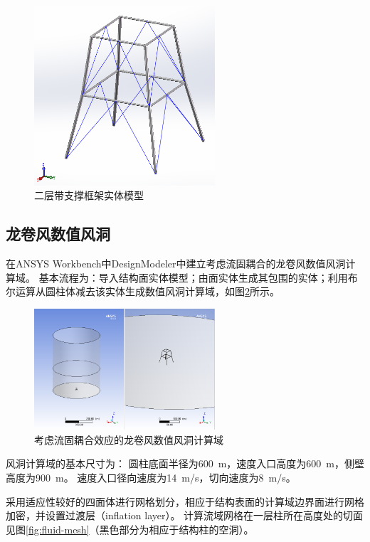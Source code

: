\documentclass{ctexart}
\begin{document}
\begin{figure}[!htpb]
  \centering
  \includegraphics[width=0.6\textwidth]{tower.png}
  \caption{二层带支撑框架实体模型}
  \label{fig:tower}
\end{figure}


\subsection{龙卷风数值风洞}
在ANSYS Workbench中DesignModeler中建立考虑流固耦合的龙卷风数值风洞计算域。
基本流程为：导入结构面实体模型；由面实体生成其包围的实体；利用布尔运算从圆柱体减去该实体生成数值风洞计算域，如图\ref{fig:domain}所示。

\begin{figure}[!htpb]
  \centering
  \includegraphics[width=0.6\textwidth]{domain.png}
  \caption{考虑流固耦合效应的龙卷风数值风洞计算域}
  \label{fig:domain}
\end{figure}

风洞计算域的基本尺寸为：
圆柱底面半径为\SI{600}{m}，速度入口高度为\SI{600}{m}，侧壁高度为\SI{900}{m}。
速度入口径向速度为\SI{14}{m/s}，切向速度为\SI{8}{m/s}。

采用适应性较好的四面体进行网格划分，相应于结构表面的计算域边界面进行网格加密，并设置过渡层（inflation layer）。
计算流域网格在一层柱所在高度处的切面见图\ref{fig:fluid-mesh}（黑色部分为相应于结构柱的空洞）。
\end{document}
